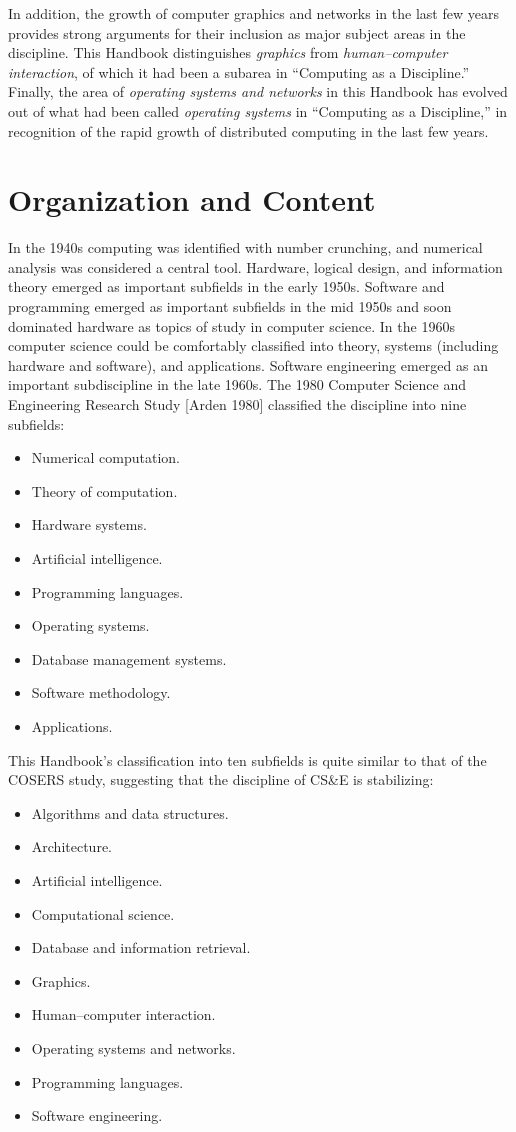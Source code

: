 In addition, the growth of computer graphics and networks in the
last few years provides strong arguments for their inclusion as
major subject areas in the discipline. This Handbook
distinguishes {\it graphics} from {\it human--computer interaction}, of
which it had been a subarea in ``Computing as a Discipline.''
Finally, the area of {\it operating systems and networks} in this
Handbook has evolved out of what had been called {\it operating
systems} in ``Computing as a Discipline,'' in recognition of the
rapid growth of distributed computing in the last few years.

\section{Organization and Content}

\noindent 
In the 1940s computing was identified with number crunching, and
numerical analysis was considered a central tool. Hardware,
logical design, and information theory emerged as important
subfields in the early 1950s. Software and programming emerged
as important subfields in the mid 1950s and soon dominated
hardware as topics of study in computer science. In the 1960s
computer science could be comfortably classified into theory,
systems (including hardware and software), and applications.
Software engineering emerged as an important subdiscipline in
the late 1960s. The 1980 Computer Science and Engineering
Research Study [Arden 1980] classified the discipline into nine subfields:
\begin{itemize}
\item
 Numerical computation.
\item
 Theory of computation.
\item
 Hardware systems.
\item
 Artificial intelligence.
\item
 Programming languages.
\item
 Operating systems.
\item
 Database management systems.
\item
 Software methodology.
\item
 Applications.
\end{itemize}

This Handbook's classification into ten subfields is quite
similar to that of the COSERS study, suggesting that the
discipline of CS\&E is stabilizing:
\begin{itemize}
\item
 Algorithms and data structures.
\item
 Architecture.
\item
 Artificial intelligence.
\item
 Computational science.
\item
 Database and information retrieval.
\item
 Graphics.
\item
 Human--computer interaction.
\item
 Operating systems and networks.
\item
 Programming languages.
\item
 Software engineering.
\end{itemize}


